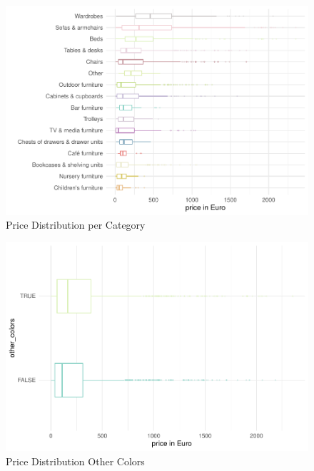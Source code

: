 \documentclass[a4paper, nobind]{templates/ociamthesis}
\begin{document}
\begin{figure}[!h]
\includegraphics[width=1\linewidth]{_main_files/figure-latex/price-dist-per-category-1} \caption{Price Distribution per Category}\label{fig:price-dist-per-category}
\end{figure}

\begin{figure}[!h]
\includegraphics[width=1\linewidth]{_main_files/figure-latex/price-dist-other-colors-1} \caption{Price Distribution Other Colors}\label{fig:price-dist-other-colors}
\end{figure}
\end{document}
